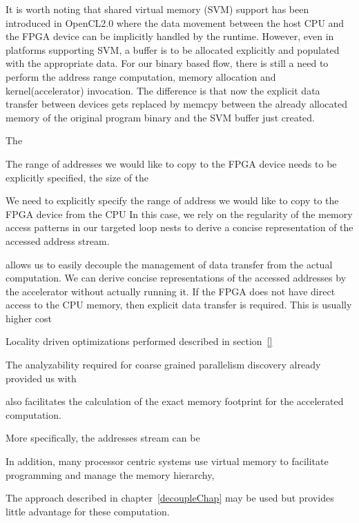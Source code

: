 It is worth noting that shared virtual memory (SVM) support has been introduced in OpenCL2.0 where the data movement between the host CPU and the FPGA device can be implicitly handled by the runtime. However, even
in platforms supporting SVM, a buffer is to be allocated explicitly and populated with the appropriate data. For our 
binary based flow, there is still a need to perform the address range computation, memory allocation and kernel(accelerator) invocation. The difference is that now the explicit data transfer between devices gets
replaced by memcpy between the already allocated memory of the original program binary and the SVM buffer just created. 

The 


The range of addresses we would like to copy
to the FPGA device needs to be explicitly specified, the size of the


We need to explicitly specify the range of address we would like to copy to the
FPGA device from the CPU
In this case, we rely on the regularity of the memory access patterns in our targeted loop nests to derive a concise representation of the accessed address stream. 




allows us to easily decouple the management of data transfer from the actual computation.
We can derive concise representations of the accessed addresses by the accelerator without actually running it. 
If the FPGA does not have direct access to the CPU memory, then explicit
data transfer is required. This is usually higher cost






Locality driven optimizations performed
described in section~\ref{}




The analyzability required for coarse grained parallelism discovery 
already provided us with 

also
facilitates the calculation of the exact memory footprint for the accelerated computation. 


More specifically, the addresses stream can be 




In addition, many processor centric systems 
use virtual memory to facilitate programming and manage the memory hierarchy, 






The approach described in chapter~\ref{decoupleChap} may be used but provides little advantage for these computation. 






